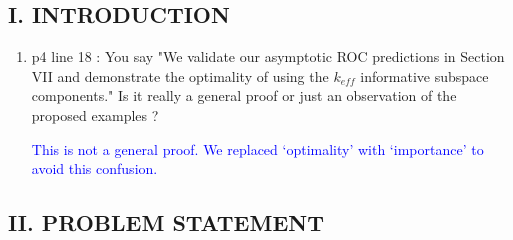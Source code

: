 \documentclass[11pt]{article}
\begin{document}
\subsection*{I. INTRODUCTION}
\begin{enumerate}
\item p4 line 18 : You say "We validate our asymptotic ROC predictions in Section VII and demonstrate
the optimality of using the $k_{eff}$ informative subspace components." Is it really a general proof or just an
observation of the proposed examples ?

\textcolor{blue}{This is not a general proof. We replaced `optimality' with `importance' to avoid this confusion.}

\end{enumerate}
\subsection*{II. PROBLEM STATEMENT}
\end{document}
